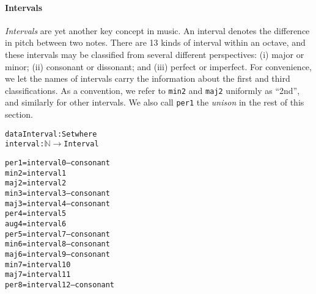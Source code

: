 \paragraph{Intervals}
\emph{Intervals} are yet another key concept in music.
An interval denotes the difference in pitch between two notes.
There are 13 kinds of interval within an octave, and these intervals
may be classified from several different perspectives: (i) major or minor;
(ii) consonant or dissonant; and (iii) perfect or imperfect.
For convenience, we let the names of intervals carry the information
about the first and third classifications.
As a convention, we refer to \texttt{min2} and \texttt{maj2}  uniformly
as ``2nd'', and similarly for other intervals.
We also call \texttt{per1} the \emph{unison} in the rest of this section.

\begin{alltt}
data Interval : Set where
interval : \(\mathbb{N}\) \(\rightarrow\) Interval

per1  = interval 0 -- consonant
min2  = interval 1
maj2  = interval 2
min3  = interval 3 -- consonant
maj3  = interval 4 -- consonant
per4  = interval 5 
aug4  = interval 6
per5  = interval 7 -- consonant
min6  = interval 8 -- consonant
maj6  = interval 9 -- consonant
min7  = interval 10
maj7  = interval 11
per8  = interval 12 -- consonant
\end{alltt}
